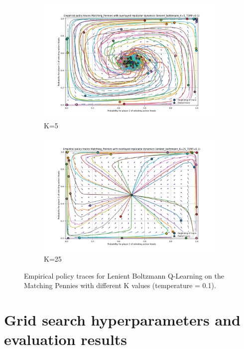 \documentclass[12pt,a4paper, onecolumn]{exam}
\begin{document}
\begin{appendices}
\begin{figure}[H]
\begin{subfigure}{0.44\textwidth}
            \includegraphics[width=\linewidth]{plots/replicator_trajectoreis_Matching_Pennies_lenient_boltzmann_K=5_TEMP=0.1.png}
            \caption{K=5}
        \end{subfigure}
        \hfill
        \begin{subfigure}{0.44\textwidth}
            \centering
            \includegraphics[width=\linewidth]{plots/replicator_trajectoreis_Matching_Pennies_lenient_boltzmann_K=25_TEMP=0.1.png}
            \caption{K=25}
        \end{subfigure}
        \caption{Empirical policy traces for Lenient Boltzmann Q-Learning on the Matching Pennies with different K values (temperature = 0.1).}
        \label{fig:app_matching_pennies_k_values}
    \end{figure}


    \section{Grid search hyperparameters and evaluation results}


\end{appendices}
\end{document}
